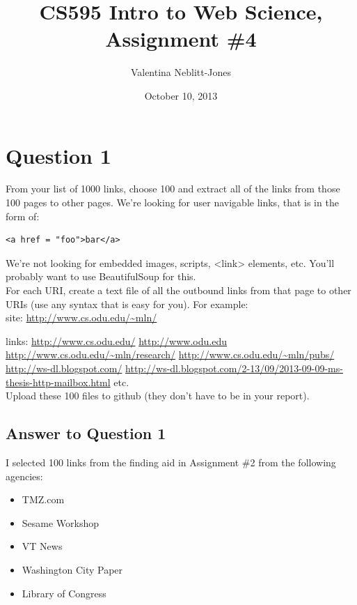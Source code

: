 \documentclass{article}
\begin{document}
\title{CS595 Intro to Web Science, Assignment \#4}
\author{Valentina Neblitt-Jones}
\date{October 10, 2013}
\maketitle

\section*{Question 1}

From your list of 1000 links, choose 100 and extract all of the links from those 100 pages to other pages. We're looking for user navigable links, that is in the form of:  \\

\begin{verbatim}
<a href = "foo">bar</a>
\end{verbatim}

We're not looking for embedded images, scripts, <link> elements, etc. You'll probably want to use BeautifulSoup for this. \\

For each URI, create a text file of all the outbound links from that page to other URIs (use any syntax that is easy for you). For example: \\

site:
\url{http://www.cs.odu.edu/~mln/}

links:
\url{http://www.cs.odu.edu/}
\url{http://www.odu.edu}
\url{http://www.cs.odu.edu/~mln/research/}
\url{http://www.cs.odu.edu/~mln/pubs/}
\url{http://ws-dl.blogspot.com/}
\url{http://ws-dl.blogspot.com/2-13/09/2013-09-09-ms-thesis-http-mailbox.html}
etc. \\

Upload these 100 files to github (they don't have to be in your report).

\subsection*{Answer to Question 1}

I selected 100 links from the finding aid in Assignment \#2 from the following agencies:

\begin{itemize}
\item TMZ.com
\item Sesame Workshop
\item VT News
\item Washington City Paper
\item Library of Congress 
\end{itemize}
\end{document}
